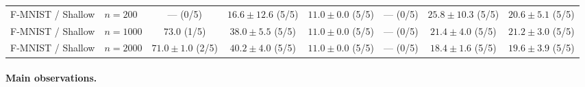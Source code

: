 \documentclass[11pt,a4paper]{article}
\newcommand{\ecart}{\pm}
\begin{document}
\begin{table}[H]
{\begin{tabular}{@{}ll|cc|cc|cc@{}}
    \midrule
    F-MNIST / Shallow & $n\!=\!200$ &
    --- (0/5) &
    $16.6 \ecart 12.6$ (5/5) &
    $11.0 \ecart 0.0$ (5/5) &
    --- (0/5) &
    $25.8 \ecart 10.3$ (5/5) &
    $20.6 \ecart 5.1$ (5/5) \\

    F-MNIST / Shallow & $n\!=\!1000$ &
    $73.0$ (1/5) &
    $38.0 \ecart 5.5$ (5/5) &
    $11.0 \ecart 0.0$ (5/5) &
    --- (0/5) &
    $21.4 \ecart 4.0$ (5/5) &
    $21.2 \ecart 3.0$ (5/5) \\

    F-MNIST / Shallow & $n\!=\!2000$ &
    $71.0 \ecart 1.0$ (2/5) &
    $40.2 \ecart 4.0$ (5/5) &
    $11.0 \ecart 0.0$ (5/5) &
    --- (0/5) &
    $18.4 \ecart 1.6$ (5/5) &
    $19.6 \ecart 3.9$ (5/5) \\

    \bottomrule
  \end{tabular}}
\end{table}

\paragraph{Main observations.}
\end{document}
